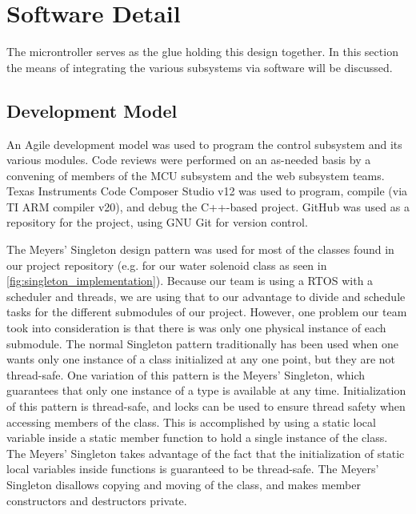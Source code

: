 \documentclass[journal]{IEEEtran}
\begin{document}
\section{Software Detail}
The microntroller serves as the glue holding this design together. In this section the means of
integrating the various subsystems via software will be discussed.
\subsection{Development Model}
An Agile development model was used to program the control subsystem and its various modules. Code reviews were performed on an as-needed basis by a convening of members of the MCU subsystem and the web subsystem teams. Texas Instruments Code Composer Studio v12 was used to program, compile (via TI ARM compiler v20), and debug the C++-based project. GitHub was used as a repository for the project, using GNU Git for version control.

The Meyers' Singleton design pattern was used for most of the classes found in our project repository (e.g. for our water solenoid class as seen in \ref{fig:singleton_implementation}). Because our team is using a RTOS with a scheduler and threads, we are using that to our advantage to divide and schedule tasks for the different submodules of our project. However, one problem our team took into consideration is that there is was only one physical instance of each submodule. The normal Singleton pattern traditionally has been used when one wants only one instance of a class initialized at any one point, but they are not thread-safe. One variation of this pattern is the Meyers' Singleton, which guarantees that only one instance of a type is available at any time. Initialization of this pattern is thread-safe, and locks can be used to ensure thread safety when accessing members of the class. This is accomplished by using a static local variable inside a static member function to hold a single instance of the class. The Meyers' Singleton takes advantage of the fact that the initialization of static local variables inside functions is guaranteed to be thread-safe. The Meyers' Singleton disallows copying and moving of the class, and makes member constructors and destructors private.

\lstset{style=mystyle}
\end{document}
